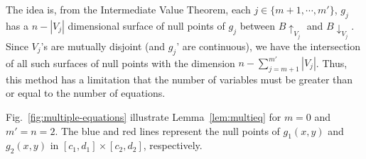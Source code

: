 \documentclass[runningheads,a4paper,oribibl]{llncs}
\begin{document}
The idea is, from the Intermediate Value Theorem,
each $j \in \{m+1, \cdots, m'\}$, $g_j$ has a $n - |V_{j}|$ dimensional surface of
null points of $g_j$ between $B\uparrow_{V_j}$ and $B\downarrow_{V_j}$.
Since $V_j$'s are mutually disjoint (and $g_j$' are continuous),
we have the intersection of all such surfaces of null points with
the dimension $n - \sum_{j=m+1}^{m'} |V_j|$.
Thus, this method has a limitation that 
the number of variables must be greater than or equal to the number of equations.

\begin{example}
Fig.~\ref{fig:multiple-equations} illustrate Lemma~\ref{lem:multieq} for $m = 0$ and $m' = n = 2$. 
The blue and red lines represent the null points of $g_1(x,y)$ and $g_2(x,y)$ in
$[c_1,d_1] \times [c_2,d_2]$, respectively. 
\end{example}


\vspace{-0.5cm}
\begin{table}[h]
\centering
{}
\medskip 
\caption{Comparison among SMT solvers with equations} \label{tab:equations}
\end{table}
\vspace{-1.5cm}
\end{document}
